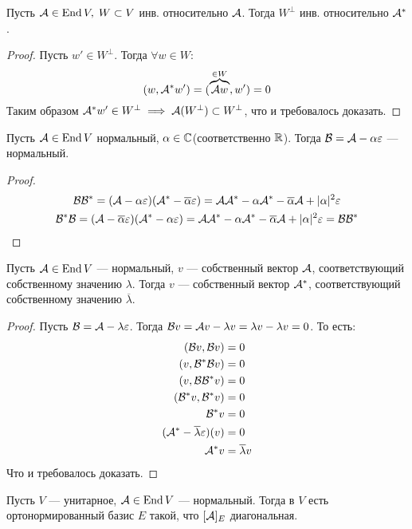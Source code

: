 \documentclass[../main.tex]{subfiles}
\begin{document}
\begin{theorem-non}
  Пусть $\mathcal{A} \in \operatorname{End} V,\; W \subset V$ инв. относительно $\mathcal{A}$. Тогда $W^\perp$ инв. относительно $\mathcal{A}^{*}$.
\end{theorem-non}
\begin{proof}
  Пусть $w' \in W^\perp$. Тогда $\forall w \in W$:
  \begin{equation*}
    (w, \mathcal{A}^{*} w') = (\overbrace{\mathcal{A} w}^{\in W}, w') = 0
  \end{equation*}
  Таким образом $\mathcal{A}^{*} w' \in W^\perp \implies \mathcal{A}(W^\perp) \subset W^\perp$, что и требовалось доказать.
\end{proof}

\begin{theorem-non}
  Пусть $\mathcal{A} \in \operatorname{End} V$ нормальный, $\alpha \in \mathbb{C}$(соответственно $\mathbb{R}$). Тогда $\mathcal{B} = \mathcal{A} - \alpha \varepsilon$ --- нормальный.
\end{theorem-non}
\begin{proof}
  \begin{equation*}
    \begin{gathered}
      \mathcal{B} \mathcal{B}^{*} = (\mathcal{A} - \alpha \varepsilon)(\mathcal{A}^{*} - \overline{\alpha}\varepsilon)
                = \mathcal{A} \mathcal{A}^{*} - \alpha \mathcal{A}^{*} - \overline{\alpha} \mathcal{A} + | \alpha |^2 \varepsilon \\
      \mathcal{B}^{*} \mathcal{B} = (\mathcal{A} - \overline{\alpha} \varepsilon)(\mathcal{A}^{*} - \alpha\varepsilon)
                = \mathcal{A} \mathcal{A}^{*} - \alpha \mathcal{A}^{*} - \overline{\alpha} \mathcal{A} + | \alpha |^2 \varepsilon = \mathcal{B} \mathcal{B}^{*}
    \end{gathered}
  \end{equation*}
\end{proof}

\begin{theorem-non}
  Пусть $\mathcal{A} \in \operatorname{End} V$ --- нормальный, $v$ --- собственный вектор $\mathcal{A}$, соответствующий собственному значению $\lambda$. Тогда $v$ --- собственный вектор $\mathcal{A}^{*}$, соответствующий собственному значению $\overline{\lambda}$.
\end{theorem-non}
\begin{proof}
  Пусть $\mathcal{B} = \mathcal{A} - \lambda \varepsilon$. Тогда $\mathcal{B} v = \mathcal{A} v - \lambda v = \lambda v - \lambda v = 0$. То есть:
  \begin{align*}
    (\mathcal{B} v, \mathcal{B} v) &= 0 \\
    (v, \mathcal{B}^{*} \mathcal{B} v) &= 0 \\
    (v, \mathcal{B} \mathcal{B}^{*} v) &= 0 \\
    (\mathcal{B}^{*} v, \mathcal{B}^{*} v) &= 0 \\
    \mathcal{B}^{*} v &= 0 \\
    (\mathcal{A}^{*} - \overline{\lambda} \varepsilon)(v) &= 0 \\
    \mathcal{A}^{*} v &= \overline{\lambda} v
  \end{align*}
  Что и требовалось доказать.
\end{proof}

\begin{theorem}
  Пусть $V$ --- унитарное, $\mathcal{A} \in \operatorname{End} V$ --- нормальный. Тогда в $V$ есть ортонормированный базис $E$ такой, что $[\mathcal{A}]_E$ диагональная.
\end{theorem}
\end{document}
